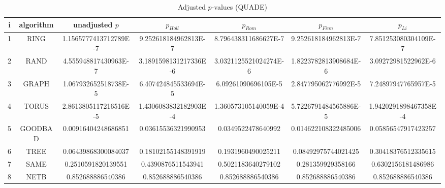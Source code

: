\documentclass[a4paper,10pt]{article}
\begin{document}
\begin{landscape}
\begin{table}[!htp]
\centering\scriptsize
\caption{Adjusted $p$-values (QUADE)}
\begin{tabular}{ccccccc}
i&algorithm&unadjusted $p$&$p_{Holl}$&$p_{Rom}$&$p_{Finn}$&$p_{Li}$\\
\hline
1& RING&1.1565777413712789E-7&9.252618184962813E-7&8.796438311686627E-7&9.252618184962813E-7&7.851253080304109E-7\\
2& RAND&4.555948817430963E-7&3.1891598131217336E-6&3.0321125521024274E-6&1.8223782813908684E-6&3.09272981522962E-6\\
3& GRAPH&1.067932652518738E-5&6.407424845533694E-5&6.09261090696105E-5&2.847795062776992E-5&7.24897947765957E-5\\
4& TORUS&2.8613805117216516E-5&1.4306083832182903E-4&1.360573105140059E-4&5.7226791484565886E-5&1.9420291898467358E-4\\
5& GOODBAD&0.00916404248686851&0.03615536321990953&0.0349522478640992&0.014622108322485006&0.05856547917423257\\
6& TREE&0.06439868300084037&0.18102155148391919&0.1931960490025211&0.08492975744021425&0.30418376512335615\\
7& SAME&0.2510591820139551&0.4390876511543941&0.5021183640279102&0.281359929358166&0.6302156181486986\\
8& NETB&0.852688886540386&0.852688886540386&0.852688886540386&0.852688886540386&0.852688886540386\\
\hline
\end{tabular}
\end{table}

\end{landscape}
\end{document}
